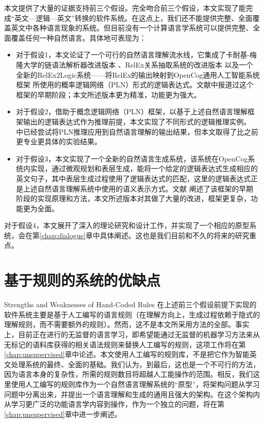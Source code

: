本文提供了大量的证据支持前三个假设。完全吻合前三个假设，本文实现了能完成“英文—逻辑—英文”转换的软件系统。在这点上，我们还不能提供完整、全面覆盖英文中各种语言现象的系统。但目前没有一个计算语言学系统可以提供完整、全面覆盖任何一种自然语言。具体地可表现为：
\begin{itemize}
\item 对于假设1，本文论证了一个可行的自然语言理解流水线，它集成了卡耐基-梅隆大学的链语法解析器改进版本 \cite{Sleator1993}、RelEx关系抽取系统\cite{Goertzel2006}的改进版本 以及一个全新的RelEx2Logic系统——将RelEx的输出映射到OpenCog通用人工智能系统框架 \cite{EGI1}\cite{EGI2}所使用的概率逻辑网络（PLN）形式的逻辑表达式。文献\cite{Lian2012}中报道过这个框架的早期阶段；本文所述版本更为精准，功能更为强大。
\item 对于假设2，借助于概念逻辑网络（PLN）框架，以基于上述自然语言理解框架输出的逻辑表达式作为推理前提，本文实现了不同形式的逻辑推理实例。
 \cite{Goertzel2006}中已经尝试将PLN推理应用到自然语言理解的输出结果，但本文取得了比之前更专业更具体的实验结果。
\item 对于假设3，本文实现了一个全新的自然语言生成系统，该系统在OpenCog系统内实现，通过微观规划和表层生成，能将一个给定的逻辑表达式生成相应的英文句子，其中表层生成过程使用了逻辑表达式的匹配，这里的逻辑表达式正是上述自然语言理解系统中使用的语义表示方式。文献 \cite{Lian2010}阐述了该框架的早期阶段的实现原理和方法，本文所述版本对其做了大量的改进，框架更复杂，功能更为全面。

\end{itemize}
\noindent 对于假设4，本文展开了深入的理论研究和设计工作，并实现了一个相应的原型系统，会在第\ref{chap:dialogue}章中具体阐述。这也是我们目前和不久的将来的研究重点。


\section{基于规则的系统的优缺点}{Strengths and Weaknesses of Hand-Coded Rules}
在上述前三个假设前提下实现的软件系统主要是基于人工编写的语言规则（在理解方向上，生成过程依赖于隐式的理解规则，而不需要额外的规则）。然而，这不是本文所采用方法的全部。事实上，目前正在进行的无监督的语言学习，即希望能通过无监督的机器学习方法来从无标记的语料库获得的相关语法规则来替换人工编写的规则，这项工作将在第\ref{chap:unsupervised}章中论述。本文使用人工编写的规则库，不是把它作为智能英文处理系统的最终、全面的基础。我们认为，到最后，这也是一个不可行的方法，因为语言本身的复杂性，所需的规则数目将超越人工能操作的范围。相反，我们这里使用人工编写的规则库作为一个自然语言理解系统的“原型”，将架构问题从学习问题中分离出来，并提出一个语言理解和生成的通用且强大的架构。在这个架构内从学习更广泛的功能语言学内容到操作，作为一个独立的问题，将在第\ref{chap:unsupervised}章中进一步阐述。

